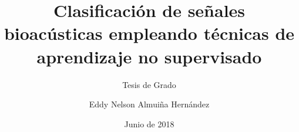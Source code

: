 \title{Clasificación de señales bioacústicas empleando técnicas de aprendizaje no supervisado}

\subtitle{Tesis de Grado}

\author{Eddy Nelson Almuiña Hernández}


\date{Junio de 2018}

